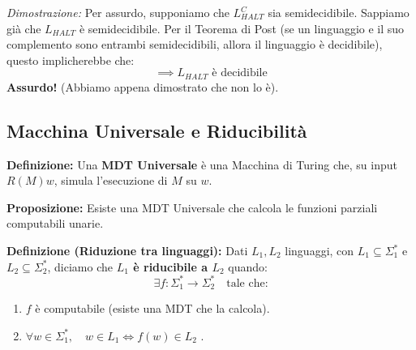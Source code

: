 \vspace{0.2cm}
\textit{Dimostrazione:} Per assurdo, supponiamo che $L_{HALT}^C$ sia semidecidibile.
Sappiamo già che $L_{HALT}$ è semidecidibile.
Per il Teorema di Post (se un linguaggio e il suo complemento sono entrambi semidecidibili, allora il linguaggio è decidibile), questo implicherebbe che:
$$ \implies L_{HALT} \text{ è decidibile} $$
\textbf{Assurdo!} (Abbiamo appena dimostrato che non lo è).











\vspace{0.8cm}
\subsection{Macchina Universale e Riducibilità}

\textbf{Definizione:} Una \textbf{MDT Universale} è una Macchina di Turing che, su input $R(M)w$, simula l'esecuzione di $M$ su $w$.

\vspace{0.2cm}
\textbf{Proposizione:} Esiste una MDT Universale che calcola le funzioni parziali computabili unarie.

\vspace{0.6cm}
\textbf{Definizione (Riduzione tra linguaggi):} Dati $L_1, L_2$ linguaggi, con $L_1 \subseteq \Sigma_1^*$ e $L_2 \subseteq \Sigma_2^*$, diciamo che \textbf{$L_1$ è riducibile a $L_2$} quando:
$$ \exists f: \Sigma_1^* \to \Sigma_2^* \quad \text{tale che:} $$
\begin{enumerate}
    \item $f$ è computabile (esiste una MDT che la calcola).
    \item $\forall w \in \Sigma_1^*, \quad w \in L_1 \iff f(w) \in L_2$ .
\end{enumerate}

\begin{center}
\end{center}

